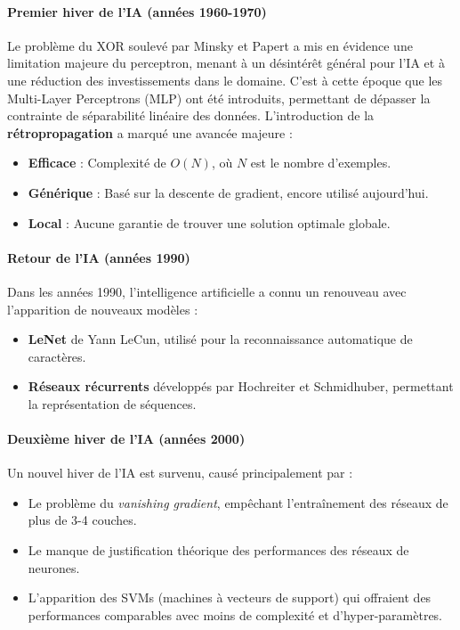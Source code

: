 \documentclass{article}
\begin{document}
\paragraph{Premier hiver de l'IA (années 1960-1970)}
Le problème du XOR soulevé par Minsky et Papert a mis en évidence une limitation majeure du perceptron, menant à un désintérêt général pour l'IA et à une réduction des investissements dans le domaine. C'est à cette époque que les Multi-Layer Perceptrons (MLP) ont été introduits, permettant de dépasser la contrainte de séparabilité linéaire des données. L'introduction de la \textbf{rétropropagation} a marqué une avancée majeure :
\begin{itemize}
    \item \textbf{Efficace} : Complexité de \( O(N) \), où \( N \) est le nombre d'exemples.
    \item \textbf{Générique} : Basé sur la descente de gradient, encore utilisé aujourd'hui.
    \item \textbf{Local} : Aucune garantie de trouver une solution optimale globale.
\end{itemize}

\paragraph{Retour de l'IA (années 1990)}
Dans les années 1990, l'intelligence artificielle a connu un renouveau avec l'apparition de nouveaux modèles :
\begin{itemize}
    \item \textbf{LeNet} de Yann LeCun, utilisé pour la reconnaissance automatique de caractères.
    \item \textbf{Réseaux récurrents} développés par Hochreiter et Schmidhuber, permettant la représentation de séquences.
\end{itemize}

\paragraph{Deuxième hiver de l'IA (années 2000)}
Un nouvel hiver de l'IA est survenu, causé principalement par :
\begin{itemize}
    \item Le problème du \textit{vanishing gradient}, empêchant l'entraînement des réseaux de plus de 3-4 couches.
    \item Le manque de justification théorique des performances des réseaux de neurones.
    \item L'apparition des SVMs (machines à vecteurs de support) qui offraient des performances comparables avec moins de complexité et d'hyper-paramètres.
\end{itemize}
\end{document}
